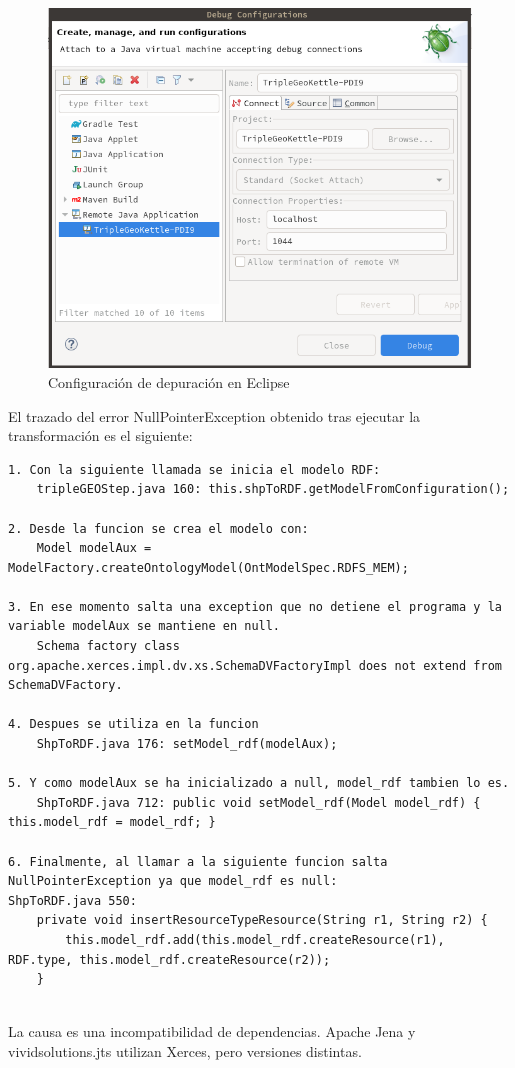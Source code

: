 \begin{figure}[H]
    \includegraphics[width=\textwidth]{images/debug-configurations.png}
    \centering
    \caption{Configuración de depuración en Eclipse}
    \label{fig:debug-configurations}
\end{figure}

El trazado del error NullPointerException obtenido tras ejecutar la transformación es el siguiente:

\begin{lstlisting}
1. Con la siguiente llamada se inicia el modelo RDF:
    tripleGEOStep.java 160: this.shpToRDF.getModelFromConfiguration();

2. Desde la funcion se crea el modelo con:
    Model modelAux = ModelFactory.createOntologyModel(OntModelSpec.RDFS_MEM);

3. En ese momento salta una exception que no detiene el programa y la variable modelAux se mantiene en null.
    Schema factory class org.apache.xerces.impl.dv.xs.SchemaDVFactoryImpl does not extend from SchemaDVFactory.

4. Despues se utiliza en la funcion
    ShpToRDF.java 176: setModel_rdf(modelAux);

5. Y como modelAux se ha inicializado a null, model_rdf tambien lo es.
    ShpToRDF.java 712: public void setModel_rdf(Model model_rdf) { this.model_rdf = model_rdf; }

6. Finalmente, al llamar a la siguiente funcion salta NullPointerException ya que model_rdf es null:
ShpToRDF.java 550:
	private void insertResourceTypeResource(String r1, String r2) {
		this.model_rdf.add(this.model_rdf.createResource(r1), RDF.type, this.model_rdf.createResource(r2));
	}


\end{lstlisting}
La causa es una incompatibilidad de dependencias.
Apache Jena y vividsolutions.jts utilizan Xerces, pero versiones distintas.



